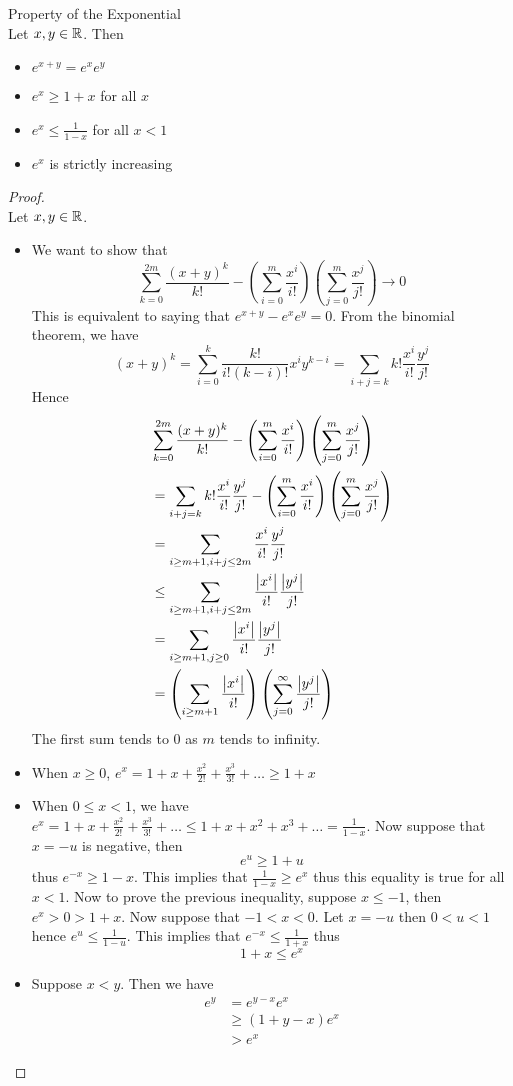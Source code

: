 \documentclass[a4paper]{article}
\begin{document}
\begin{thm}{Property of the Exponential}{}\\ Let $x,y\in\mathbb{R}$. Then 
\begin{itemize}
\item $e^{x+y}=e^xe^y$
\item $e^x\geq 1+x$ for all $x$
\item $e^x\leq\frac{1}{1-x}$ for all $x<1$
\item $e^x$ is strictly increasing
\end{itemize}
\begin{proof}\\ Let $x,y\in\mathbb{R}$. 
\begin{itemize}
\item We want to show that $$\sum_{k=0}^{2m}\frac{(x+y)^k}{k!}-\left(\sum_{i=0}^m\frac{x^i}{i!}\right)\left(\sum_{j=0}^m\frac{x^j}{j!}\right)\to0$$ This is equivalent to saying that $e^{x+y}-e^xe^y=0$. From the binomial theorem, we have $$(x+y)^k=\sum_{i=0}^k\frac{k!}{i!(k-i)!}x^iy^{k-i}=\sum_{i+j=k}k!\frac{x^i}{i!}\frac{y^j}{j!}$$ Hence
\begin{align*}
&\sum_{k=0}^{2m}\frac{(x+y)^k}{k!}-\left(\sum_{i=0}^m\frac{x^i}{i!}\right)\left(\sum_{j=0}^m\frac{x^j}{j!}\right)\\
&=\sum_{i+j=k}k!\frac{x^i}{i!}\frac{y^j}{j!}-\left(\sum_{i=0}^m\frac{x^i}{i!}\right)\left(\sum_{j=0}^m\frac{x^j}{j!}\right)\\
&=\sum_{i\geq m+1,i+j\leq 2m}\frac{x^i}{i!}\frac{y^j}{j!}\\
&\leq\sum_{i\geq m+1,i+j\leq 2m}\frac{\abs{x^i}}{i!}\frac{\abs{y^j}}{j!}\\
&=\sum_{i\geq m+1,j\geq0}\frac{\abs{x^i}}{i!}\frac{\abs{y^j}}{j!}\\
&=\left(\sum_{i\geq m+1}\frac{\abs{x^i}}{i!}\right)\left(\sum_{j=0}^\infty\frac{\abs{y^j}}{j!}\right)
\end{align*} The first sum tends to $0$ as $m$ tends to infinity. 
\item When $x\geq0$, $e^x=1+x+\frac{x^2}{2!}+\frac{x^3}{3!}+\dots\geq 1+x$
\item When $0\leq x<1$, we have $e^x=1+x+\frac{x^2}{2!}+\frac{x^3}{3!}+\dots\leq1+x+x^2+x^3+\dots=\frac{1}{1-x}$. Now suppose that $x=-u$ is negative, then $$e^u\geq1+u$$ thus $e^{-x}\geq1-x$. This implies that $\frac{1}{1-x}\geq e^x$ thus this equality is true for all $x<1$. Now to prove the previous inequality, suppose $x\leq-1$, then $e^x>0>1+x$. Now suppose that $-1<x<0$. Let $x=-u$ then $0<u<1$ hence $e^u\leq\frac{1}{1-u}$. This implies that $e^{-x}\leq\frac{1}{1+x}$ thus $$1+x\leq e^x$$
\item Suppose $x<y$. Then we have
\begin{align*}
e^y&=e^{y-x}e^x\\
&\geq(1+y-x)e^x\\
&>e^x
\end{align*}
\end{itemize}
\end{proof}
\end{thm}
\end{document}
